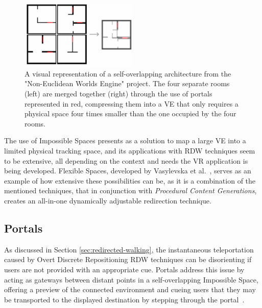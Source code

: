 \begin{figure}[t]
   \centering
    \includegraphics[width=0.5\textwidth]{NOVAthesisFiles/Images/papers/self-overlapping.png}
    \caption[Illustration of a Self-Overlapping Architecture]{A visual representation of a self-overlapping architecture from the "Non-Euclidean Worlds Engine" project.
    The four separate rooms (left) are merged together (right) through the use of portals represented in red, compressing them into a 
    \gls{VE} that only requires a physical space four times smaller than the one occupied by the four rooms.}
   \label{fig:self-Overlapping}
\end{figure}

The use of Impossible Spaces presents as a solution to map a large \gls{VE} into a limited physical tracking space, and its applications 
with \gls{RDW} techniques seem to be extensive, all depending on the context and needs the \gls{VR} application is being developed.
Flexible Spaces, developed by Vasylevska et al.~\cite{6550194}, serves as an example of how extensive these possibilities can be,
as it is a combination of the mentioned techniques, that in conjunction with \textit{Procedural Content Generations}, 
creates an all-in-one dynamically adjustable redirection technique. 


\subsection{Portals}
\label{sec:portals-research}

As discussed in Section \ref{sec:redirected-walking}, the instantaneous teleportation caused by Overt Discrete Repositioning 
\gls{RDW} techniques can be disorienting if users are not provided with an appropriate cue. Portals address this issue by 
acting as gateways between distant points in a self-overlapping Impossible Space, offering a preview of the connected environment 
and cueing users that they may be transported to the displayed destination by stepping through the portal~\cite{Freitag2014,Jaksties2022,Liu2018b,Lochner2021}.

